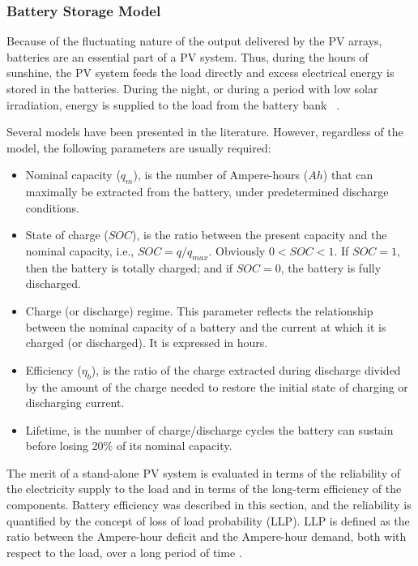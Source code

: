 \subsubsection{Battery Storage Model}

Because of the fluctuating nature of the output delivered by the PV arrays, batteries are an essential part of a PV system. Thus, during the hours of sunshine, the PV system feeds the load directly and excess electrical energy is stored in the batteries. During the night, or during a period with low solar irradiation, energy is supplied to the load from the battery bank ~\cite{Mellit}.
  
Several models have been presented in the literature. However, regardless of the model, the following parameters are usually required\cite{Mellit}: 

\begin{itemize}
\item Nominal capacity ($ q_{m} $), is the number of Ampere-hours ($ Ah $) that can maximally be extracted from the battery, under predetermined discharge conditions.
\item State of charge ($ SOC $), is the ratio between the present capacity and the nominal capacity, i.e., $ SOC = q/q_{max} $. Obviously $ 0<SOC<1 $. If $ SOC=1 $, then the battery is totally charged; and if $ SOC=0 $, the battery is fully discharged.
\item Charge (or discharge) regime. This parameter reflects the relationship between the nominal capacity of a battery and the current at which it is charged (or discharged). It is expressed in hours. %
\item Efficiency ($\eta_{b}$), is the ratio of the charge extracted during discharge divided by the amount of the charge needed to restore the initial state of charging or discharging current. 
\item Lifetime, is the number of charge/discharge cycles the battery can sustain before losing 20\% of its nominal capacity.
\end{itemize}

The merit of a stand-alone PV system is evaluated in terms of the reliability of the electricity supply to the load and in terms of the long-term efficiency of the components. Battery efficiency was described in this section, and the reliability is quantified by the concept of loss of load probability (LLP). LLP is defined as the ratio between the Ampere-hour deficit and the Ampere-hour demand, both with respect to the load, over a long period of time \cite{Copetti}. 

